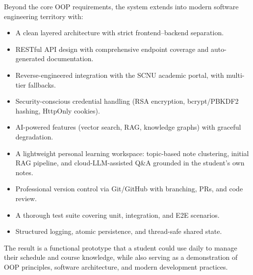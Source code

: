 \documentclass[12pt,a4paper]{article}
\begin{document}
Beyond the core OOP requirements, the system extends into modern software engineering territory with:
\begin{itemize}[nosep]
    \item A clean layered architecture with strict frontend--backend separation.
    \item RESTful API design with comprehensive endpoint coverage and auto-generated documentation.
    \item Reverse-engineered integration with the SCNU academic portal, with multi-tier fallbacks.
    \item Security-conscious credential handling (RSA encryption, bcrypt/PBKDF2 hashing, HttpOnly cookies).
    \item AI-powered features (vector search, RAG, knowledge graphs) with graceful degradation.
    \item A lightweight personal learning workspace: topic-based note clustering, initial RAG pipeline, and cloud-LLM-assisted Q\&A grounded in the student's own notes.
    \item Professional version control via Git/GitHub with branching, PRs, and code review.
    \item A thorough test suite covering unit, integration, and E2E scenarios.
    \item Structured logging, atomic persistence, and thread-safe shared state.
\end{itemize}

The result is a functional prototype that a student could use daily to manage their schedule and course knowledge, while also serving as a demonstration of OOP principles, software architecture, and modern development practices.
\end{document}
